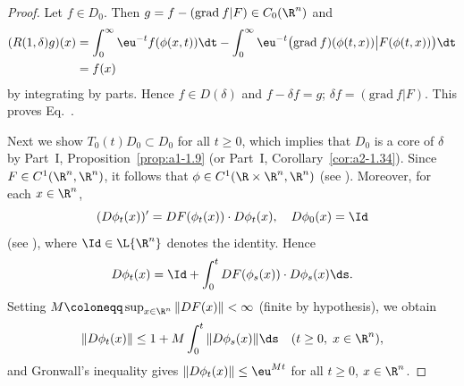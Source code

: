 \begin{proof}
Let $f \in D_{0}$.
Then $g = f - (\mathrm{grad}\: f | F) \in C_{0}(\R^{n})$ and
\[
\begin{split}
(R(1,\delta)g)(x) 
&= \int_{0}^{\infty} \eu^{-t}f(\phi(x,t)) \dt - \int_{0}^{\infty} 
\eu^{-t}\big(\mathrm{grad}\: f)(\phi(t,x)) \big| F(\phi(t,x))\big) \dt \\
&= f(x)
\end{split}
\]
 by integrating by parts.
Hence $f \in D(\delta)$ and $f - \delta f = g$; \ie $\delta f = (\mathrm{grad}\: f|F)$.
This proves Eq.~.


Next we show $T_{0}(t)D_{0} \subset D_{0}$ for all $t \geq 0$, which implies that $D_{0}$
is a core of\/ $\delta$ by Part~I, Proposition~\ref{prop:a1-1.9}
(or Part~I, Corollary~\ref{cor:a2-1.34}).
Since $F \in C^{1}(\R^{n},\R^{n})$, it follows that
$\phi \in C^{1}(\R \times \R^{n},\R^{n})$
(see \eg \textcite[15.2]{hirschsmale:1974}).
Moreover, for each $x \in \R^{n}$,
\[
    (D\phi_{t}(x))' = DF(\phi_{t}(x)) \cdot D\phi_{t}(x), \quad D\phi_{0}(x) = \Id
\]
(see \textcite[p.\,300]{hirschsmale:1974}), where $\Id \in \L{\R^{n}}$ denotes the identity.
Hence
\[
    D\phi_{t}(x) = \Id + \int_{0}^{t} DF(\phi_{s}(x)) \cdot D\phi_{s}(x) \ds.
\]
Setting $M \coloneqq \sup_{x \in \R^{n}} \|DF(x)\| < \infty$ (finite by hypothesis),
we obtain
\[
    \|D\phi_{t}(x)\| \leq 1 + M\int_{0}^{t} \|D\phi_{s}(x)\| \ds
    \quad (t \geq 0,\; x \in \R^{n}),
\]
and Gronwall's inequality gives $\|D\phi_{t}(x)\| \leq \eu^{Mt}$ for all $t \geq 0$,
$x \in \R^{n}$.


\end{proof}
